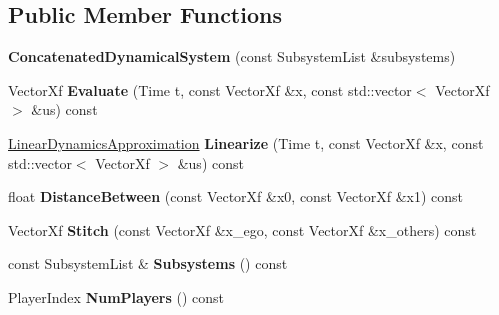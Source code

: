 \subsection*{Public Member Functions}
\begin{DoxyCompactItemize}
\item 
{\bfseries Concatenated\+Dynamical\+System} (const Subsystem\+List \&subsystems)\hypertarget{classilqgames_1_1_concatenated_dynamical_system_a1ea0fa373cf8c541ac18cb986a53c51f}{}\label{classilqgames_1_1_concatenated_dynamical_system_a1ea0fa373cf8c541ac18cb986a53c51f}

\item 
Vector\+Xf {\bfseries Evaluate} (Time t, const Vector\+Xf \&x, const std\+::vector$<$ Vector\+Xf $>$ \&us) const \hypertarget{classilqgames_1_1_concatenated_dynamical_system_aba82e3499a437d6c27c8575f0e749298}{}\label{classilqgames_1_1_concatenated_dynamical_system_aba82e3499a437d6c27c8575f0e749298}

\item 
\hyperlink{structilqgames_1_1_linear_dynamics_approximation}{Linear\+Dynamics\+Approximation} {\bfseries Linearize} (Time t, const Vector\+Xf \&x, const std\+::vector$<$ Vector\+Xf $>$ \&us) const \hypertarget{classilqgames_1_1_concatenated_dynamical_system_a9939297ff3859abc1cf0ad6207783167}{}\label{classilqgames_1_1_concatenated_dynamical_system_a9939297ff3859abc1cf0ad6207783167}

\item 
float {\bfseries Distance\+Between} (const Vector\+Xf \&x0, const Vector\+Xf \&x1) const \hypertarget{classilqgames_1_1_concatenated_dynamical_system_a5d241472286d6f3e49b38c02e47d25f1}{}\label{classilqgames_1_1_concatenated_dynamical_system_a5d241472286d6f3e49b38c02e47d25f1}

\item 
Vector\+Xf {\bfseries Stitch} (const Vector\+Xf \&x\+\_\+ego, const Vector\+Xf \&x\+\_\+others) const \hypertarget{classilqgames_1_1_concatenated_dynamical_system_a81183125fda71b1d57a1630d27f21d98}{}\label{classilqgames_1_1_concatenated_dynamical_system_a81183125fda71b1d57a1630d27f21d98}

\item 
const Subsystem\+List \& {\bfseries Subsystems} () const \hypertarget{classilqgames_1_1_concatenated_dynamical_system_a8556844c77ee4445d47f11a327d19192}{}\label{classilqgames_1_1_concatenated_dynamical_system_a8556844c77ee4445d47f11a327d19192}

\item 
Player\+Index {\bfseries Num\+Players} () const \hypertarget{classilqgames_1_1_concatenated_dynamical_system_a81821c7e9776a45b319f7153bcd93248}{}\label{classilqgames_1_1_concatenated_dynamical_system_a81821c7e9776a45b319f7153bcd93248}


\end{DoxyCompactItemize}
